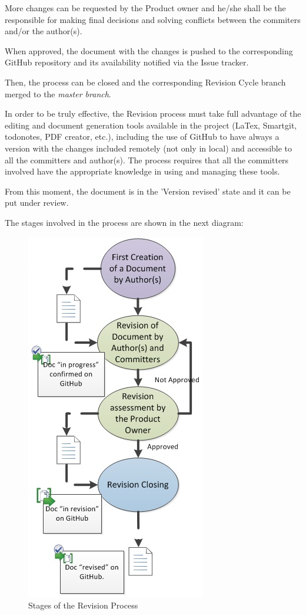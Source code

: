 \documentclass{template/openetcs_article}
\begin{document}
More changes can be requested by the Product owner and he/she shall be the responsible for making final decisions and solving conflicts between the commiters and/or the author(s).

When approved, the document with the changes is pushed to the corresponding GitHub repository and its availability notified via the Issue tracker. 

Then, the process can be closed and the corresponding Revision Cycle branch merged to the {\it master branch}.

In order to be truly effective, the Revision process must take full advantage of the editing and document generation tools available in the project (LaTex, Smartgit, todonotes, PDF creator, etc.), including the use of GitHub to have always a version with the changes included remotely (not only in local) and accessible to all the committers and author(s). The process requires that all the committers involved have the appropriate knowledge in using and managing these tools.

From this moment, the document is in the 'Version revised' state and it can be put under review.

The stages involved in the process are shown in the next diagram:

\begin{figure}[H]
\centering
\includegraphics{./figures/RevisionProcess.JPG}
\caption{Stages of the Revision Process}
\end{figure}
\end{document}

